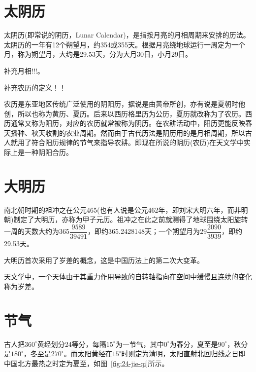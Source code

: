 \section{太阴历}
\label{sec:tai-yin-calendar}

太阴历(即常说的阴历，Lunar Calendar)，是指按月亮的月相周期来安排的历法。太阴历的一年有12个朔望月，约354或355天。根据月亮绕地球运行一周定为一个月，称为朔望月，大约是29.53天，分为大月30日，小月29日。

{\color{red}补充月相!!!。}

{\color{red}补充农历的定义！！}

农历是东亚地区传统广泛使用的阴阳历，据说是由黄帝所创，亦有说是夏朝时他创，所以也称为黄历、夏历。后来以西历格里历为公历，夏历就改称为了农历。西历通常又称为阳历，对应的农历就常被称为阴历。在农耕活动中，阳历更能反映春天播种、秋天收割的农业周期。然而由于古代历法是阴历用的是月相周期，所以古人就用了符合阳历规律的节气来指导农耕。即现在所说的阴历(农历)在天文学中实际上是一种阴阳合历。


\section{大明历}
\label{sec:da-ming-calendar}

南北朝时期的祖冲之在公元465(也有人说是公元462年，即刘宋大明六年，而非明朝)制定了大明历，亦称为甲子元历。祖冲之在此之前就测得了地球围绕太阳旋转一周的天数大约为$365\dfrac{9589}{39491}$，即约365.2428148天；一个朔望月为$29\dfrac{2090}{3939}$，即约29.53天。

大明历首次采用了岁差的概念，这是中国历法上的第二次大变革。

\begin{definition}
  天文学中，一个天体由于其重力作用导致的自转轴指向在空间中缓慢且连续的变化称为岁差。
\end{definition}


\section{节气}
\label{sec:jie-qi}

古人把$360^\circ$黄经划分24等分，每隔$15^\circ$为一节气，其中$0^\circ$为春分，夏至是$90^\circ$，秋分是$180^\circ$，冬至是$270^\circ$。而太阳黄经在$15^\circ$时则定为清明，太阳直射北回归线之日即中国北方最热之时定为夏至，如图~\ref{fig:24-jie-qi}所示。

